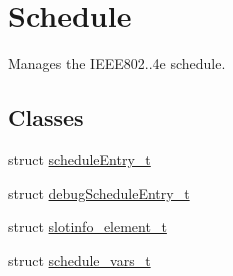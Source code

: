 \hypertarget{group___schedule}{}\section{Schedule}
\label{group___schedule}


Manages the I\+E\+E\+E802..\+4e schedule.  


\subsection*{Classes}
\begin{DoxyCompactItemize}
\item 
struct \hyperlink{structschedule_entry__t}{schedule\+Entry\+\_\+t}
\item 
struct \hyperlink{structdebug_schedule_entry__t}{debug\+Schedule\+Entry\+\_\+t}
\item 
struct \hyperlink{structslotinfo__element__t}{slotinfo\+\_\+element\+\_\+t}
\item 
struct \hyperlink{structschedule__vars__t}{schedule\+\_\+vars\+\_\+t}
\end{DoxyCompactItemize}

